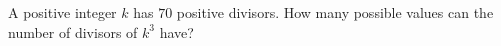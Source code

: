 A positive integer $k$ has $70$ positive divisors. How many possible values can the number of divisors of $k^3$ have?
